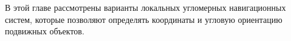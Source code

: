 \documentclass[../main.tex]{subfiles}
\begin{document}
В этой главе рассмотрены варианты локальных угломерных навигационных систем,
которые позволяют определять координаты и угловую ориентацию подвижных
объектов.

\subsection{}
\end{document}
